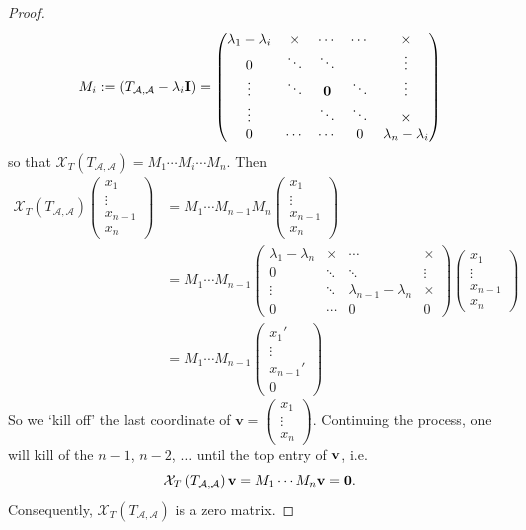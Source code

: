 \begin{proof}
$$M_i := \left( T_{\mathcal{A},\mathcal{A}} - \lambda_i \mathbf{I} \right) = \begin{pmatrix}
\lambda_1 - \lambda_i & \times & \cdots & \cdots &\times \\
0 & \ddots & \ddots & & \vdots \\
\vdots & \ddots & {\bf 0} & \ddots& \vdots \\
\vdots &  & \ddots &\ddots  &\times \\
0 & \cdots & \cdots & 0 &\lambda_n - \lambda_i
\end{pmatrix}$$
so that ${\mathcal{X}}_{T}\left( T_{\mathcal{A},\mathcal{A}}\right) = M_1\cdots M_i \cdots M_n$. Then
\begin{align*}
{\mathcal{X}}_{T}\left( T_{\mathcal{A},\mathcal{A}}\right)
\begin{pmatrix}
x_1 \\
\vdots \\
x_{n-1} \\
x_n
\end{pmatrix}
&=
M_1\cdots M_{n-1} M_n \begin{pmatrix}
x_1 \\
\vdots \\
x_{n-1} \\
x_n
\end{pmatrix} \\
&= M_1\cdots M_{n-1}\begin{pmatrix}
\lambda_1 - \lambda_n & \times &  \cdots &\times \\
0 & \ddots & \ddots & \vdots \\
\vdots &  \ddots &\lambda_{n-1} - \lambda_n  &\times \\
0  & \cdots & 0 & 0
\end{pmatrix}\begin{pmatrix}
x_1 \\
\vdots \\
x_{n-1} \\
x_n
\end{pmatrix} \\
&= M_1\cdots M_{n-1}\begin{pmatrix}
x_1' \\
\vdots \\
x_{n-1}' \\
0
\end{pmatrix}
\end{align*}
So we `kill off' the last coordinate of $\mathbf{v} =  \begin{pmatrix}
x_1 \\
\vdots \\
x_n 
\end{pmatrix}$. Continuing the process, one will kill of the $n-1$, $n-2$, $\dots$ until the top entry of ${\bf v}$, i.e.
\[
{\mathcal{X}}_{T}\left( T_{\mathcal{A},\mathcal{A}}\right){\bf v} = M_1 \cdots M_n \mathbf{v} = {\bf 0}.
\]
Consequently, ${\mathcal{X}}_{T}\left( T_{\mathcal{A},\mathcal{A}} \right)$ is a zero matrix.
\end{proof}

